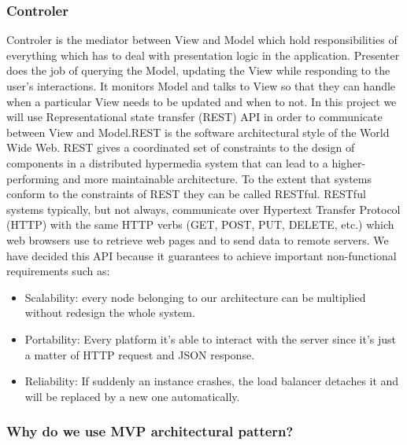 \subsubsection{Controler}
Controler is the mediator between View and Model which hold responsibilities of everything which has to deal with presentation logic in the application. Presenter does the job of querying the Model, updating the View while responding to the user’s interactions. It monitors Model and talks to View so that they can handle when a particular View needs to be updated and when to not. In this project we will use Representational state transfer (REST) API in order to communicate between View and Model.REST is the software architectural style of the World Wide Web. REST gives a coordinated set of constraints to the design of components in a distributed hypermedia system that can lead to a higher-performing and more maintainable architecture.
To the extent that systems conform to the constraints of REST they can be called RESTful. RESTful systems typically, but not always, communicate over Hypertext Transfer Protocol (HTTP) with the same HTTP verbs (GET, POST, PUT, DELETE, etc.) which web browsers use to retrieve web pages and to send data to remote servers.
We have decided this API because it guarantees to achieve important non-functional requirements such as:
\begin{itemize}
 \item Scalability: every node belonging to our architecture can be multiplied without redesign the whole system.
 \item Portability: Every platform it's able to interact with the server since it's just a matter of HTTP request and JSON response.
 \item Reliability: If suddenly an instance crashes, the load balancer detaches it and will be replaced by a new one automatically.
\end{itemize}

\subsubsection{Why do we use MVP architectural pattern?}

